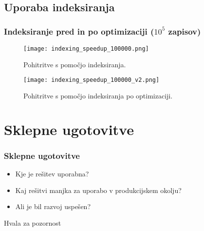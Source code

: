 \documentclass{beamer}
\begin{document}
    \subsection{Uporaba indeksiranja}
    \begin{frame}
        \frametitle{Indeksiranje pred in po optimizaciji ($10^5$ zapisov)}
        \begin{figure}
            \begin{minipage}[t]{0.45\textwidth}
                \centering
                \texttt{[image: indexing\_speedup\_100000.png]}
                \caption*{Pohitritve s pomočjo indeksiranja.}
            \end{minipage}
            \hfill
            \begin{minipage}[t]{0.45\textwidth}
                \centering
                \texttt{[image: indexing\_speedup\_100000\_v2.png]}
                \caption*{Pohitritve s pomočjo indeksiranja po optimizaciji.}
            \end{minipage}
        \end{figure}
    \end{frame}

\section{Sklepne ugotovitve}
\begin{frame}
\frametitle{Sklepne ugotovitve}
    \begin{itemize}
        \item Kje je rešitev uporabna?
        \item Kaj rešitvi manjka za uporabo v produkcijskem okolju?
        \item Ali je bil razvoj uspešen?
    \end{itemize}
\end{frame}

\begin{frame}
\Huge{\centerline{Hvala za pozornost}}
\end{frame}

\end{document}
